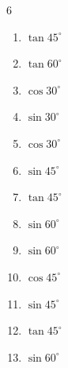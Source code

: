 \begin{multicols}{6}
\begin{enumerate}
  \item $\displaystyle \tan{45^\circ}$

        \phantom{$\displaystyle =1$}

  \item $\displaystyle \tan{60^\circ}$


  \item $\displaystyle \cos{30^\circ}$


  \item $\displaystyle \sin{30^\circ}$


  \item $\displaystyle \cos{30^\circ}$


  \item $\displaystyle \sin{45^\circ}$


  \item $\displaystyle \tan{45^\circ}$

        \phantom{$\displaystyle =1$}

  \item $\displaystyle \sin{60^\circ}$


  \item $\displaystyle \sin{60^\circ}$


\columnbreak %

  \item $\displaystyle \cos{45^\circ}$


  \item $\displaystyle \sin{45^\circ}$


  \item $\displaystyle \tan{45^\circ}$

        \phantom{$\displaystyle =1$}

  \item $\displaystyle \sin{60^\circ}$


\end{enumerate}
\end{multicols}
